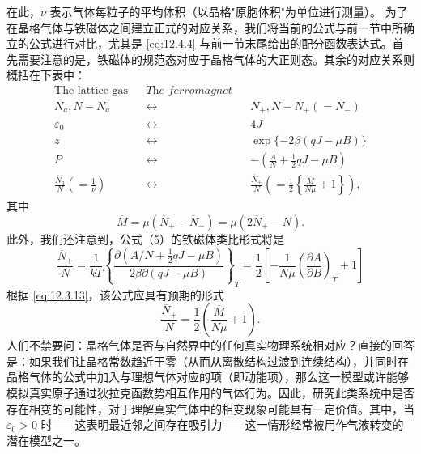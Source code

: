 在此，\(\nu\) 表示气体每粒子的平均体积（以晶格"原胞体积"为单位进行测量）。
为了在晶格气体与铁磁体之间建立正式的对应关系，我们将当前的公式与前一节中所确立的公式进行对比，尤其是 \autoref{eq:12.4.4} 与前一节末尾给出的配分函数表达式。首先需要注意的是，铁磁体的规范态对应于晶格气体的大正则态。其余的对应关系则概括在下表中：
\begin{equation}\tag{12.4.6}\label{eq:12.4.6}
\begin{aligned}\text{The lattice gas}&&\textit{The ferromagnet}\\N_{a},N-N_{a}&&\leftrightarrow&&N_{+},N-N_{+}(=N_{-})\\\varepsilon_{0}&&\leftrightarrow&&4J\\z&&\leftrightarrow&&\exp\{-2\beta(qJ-\mu B)\}\\P&&\leftrightarrow&&-\left(\frac{A}{N}+\frac{1}{2}qJ-\mu B\right)\\\frac{\overline{N}_{a}}{N}\left(=\frac{1}{\nu}\right)&&\leftrightarrow&&\frac{\overline{N}_{+}}{N}\left(=\frac{1}{2}\left\{\frac{\overline{M}}{N\mu}+1\right\}\right),\end{aligned}
\end{equation}
其中
\begin{equation}\tag{12.4.7}\label{eq:12.4.7}
\overline { { M } } = \mu \left( \overline { { N } } _ { + } - \overline { { N } } _ { - } \right) = \mu ( 2 \overline { { N } } _ { + } - N ) .
\end{equation}
此外，我们还注意到，公式（5）的铁磁体类比形式将是
\begin{equation}\tag{12.4.8}\label{eq:12.4.8}
\frac { \overline { { N } } _ { + } } { N } = \frac { 1 } { k T } \left\{ \frac { \partial \left( A / N + \frac { 1 } { 2 } q J - \mu B \right) } { 2 \beta \partial \left( q J - \mu B \right) } \right\} _ { T } = \frac { 1 } { 2 } \left[ - \frac { 1 } { N \mu } \left( \frac { \partial A } { \partial B } \right) _ { T } + 1 \right]
\end{equation}
根据 \autoref{eq:12.3.13}，该公式应具有预期的形式
\begin{equation}\tag{12.4.9}\label{eq:12.4.9}
\frac { \overline { { N } } _ { + } } { N } = \frac { 1 } { 2 } \left( \frac { \overline { { M } } } { N \mu } + 1 \right) .
\end{equation}
人们不禁要问：晶格气体是否与自然界中的任何真实物理系统相对应？直接的回答是：如果我们让晶格常数趋近于零（从而从离散结构过渡到连续结构），并同时在晶格气体的公式中加入与理想气体对应的项（即动能项），那么这一模型或许能够模拟真实原子通过狄拉克函数势相互作用的气体行为。因此，研究此类系统中是否存在相变的可能性，对于理解真实气体中的相变现象可能具有一定价值。其中，当 \(\varepsilon_0 > 0\) 时——这表明最近邻之间存在吸引力——这一情形经常被用作气液转变的潜在模型之一。

